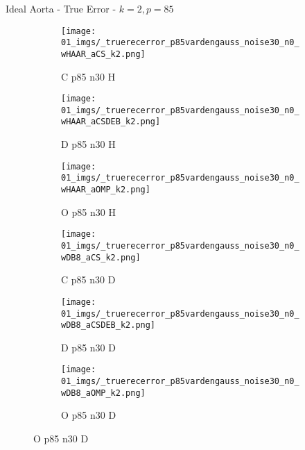 \begin{frame}{Ideal Aorta - True Error - $k=2,p=85$}{}
\begin{figure}
\begin{subfigure}{0.13\textwidth}
\texttt{[image: 01\_imgs/\_truerecerror\_p85vardengauss\_noise30\_n0\_wHAAR\_aCS\_k2.png]}
\caption*{\tiny C p85 n30 H}
\end{subfigure}
\begin{subfigure}{0.13\textwidth}
\texttt{[image: 01\_imgs/\_truerecerror\_p85vardengauss\_noise30\_n0\_wHAAR\_aCSDEB\_k2.png]}
\caption*{\tiny D p85 n30 H}
\end{subfigure}
\begin{subfigure}{0.13\textwidth}
\texttt{[image: 01\_imgs/\_truerecerror\_p85vardengauss\_noise30\_n0\_wHAAR\_aOMP\_k2.png]}
\caption*{\tiny O p85 n30 H}
\end{subfigure}
\begin{subfigure}{0.13\textwidth}
\texttt{[image: 01\_imgs/\_truerecerror\_p85vardengauss\_noise30\_n0\_wDB8\_aCS\_k2.png]}
\caption*{\tiny C p85 n30 D}
\end{subfigure}
\begin{subfigure}{0.13\textwidth}
\texttt{[image: 01\_imgs/\_truerecerror\_p85vardengauss\_noise30\_n0\_wDB8\_aCSDEB\_k2.png]}
\caption*{\tiny D p85 n30 D}
\end{subfigure}
\begin{subfigure}{0.13\textwidth}
\texttt{[image: 01\_imgs/\_truerecerror\_p85vardengauss\_noise30\_n0\_wDB8\_aOMP\_k2.png]}
\caption*{\tiny O p85 n30 D}
\end{subfigure}
\end{figure}
\end{frame}

